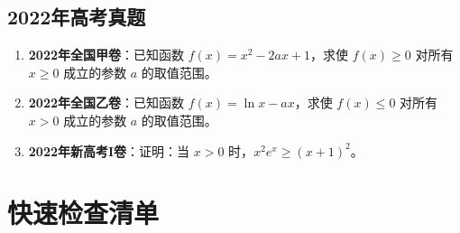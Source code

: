 \documentclass[a4paper,11pt]{ctexrep}
\theoremstyle{definition}
\begin{document}
\subsection{2022年高考真题}

\begin{enumerate}
    \item \textbf{2022年全国甲卷}：已知函数 $f(x) = x^2 - 2ax + 1$，求使 $f(x) \geq 0$ 对所有 $x \geq 0$ 成立的参数 $a$ 的取值范围。
    
    \item \textbf{2022年全国乙卷}：已知函数 $f(x) = \ln x - ax$，求使 $f(x) \leq 0$ 对所有 $x > 0$ 成立的参数 $a$ 的取值范围。
    
    \item \textbf{2022年新高考I卷}：证明：当 $x > 0$ 时，$x^2e^x \geq (x+1)^2$。
\end{enumerate}

\section{快速检查清单}
\end{document}
